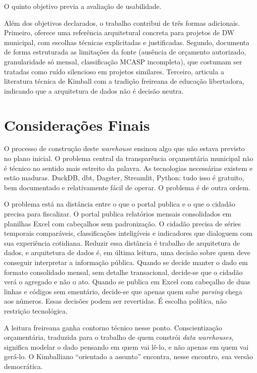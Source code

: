O quinto objetivo previa a avaliação de usabilidade. 

Além dos objetivos declarados, o trabalho contribui de três formas adicionais. Primeiro, oferece uma referência arquitetural concreta para projetos de DW municipal, com escolhas técnicas explicitadas e justificadas. Segundo, documenta de forma estruturada as limitações da fonte (ausência de orçamento autorizado, granularidade só mensal, classificação MCASP incompleta), que costumam ser tratadas como ruído silencioso em projetos similares. Terceiro, articula a literatura técnica de Kimball com a tradição freireana de educação libertadora, indicando que a arquitetura de dados não é decisão neutra.

\section{Considerações Finais}

O processo de construção deste \textit{warehouse} ensinou algo que não estava previsto no plano inicial. O problema central da transparência orçamentária municipal não é técnico no sentido mais estreito da palavra. As tecnologias necessárias existem e estão maduras. DuckDB, dbt, Dagster, Streamlit, Python: tudo isso é gratuito, bem documentado e relativamente fácil de operar. O problema é de outra ordem.

O problema está na distância entre o que o portal publica e o que o cidadão precisa para fiscalizar. O portal publica relatórios mensais consolidados em planilhas Excel com cabeçalhos sem padronização. O cidadão precisa de séries temporais comparáveis, classificações inteligíveis e indicadores que dialoguem com sua experiência cotidiana. Reduzir essa distância é trabalho de arquitetura de dados, e arquitetura de dados é, em última leitura, uma decisão sobre quem deve conseguir interpretar a informação pública. Quando se decide manter o dado em formato consolidado mensal, sem detalhe transacional, decide-se que o cidadão verá o agregado e não o ato. Quando se publica em Excel com cabeçalho de duas linhas e códigos sem ementário, decide-se que apenas quem sabe \textit{parsing} chega aos números. Essas decisões podem ser revertidas. É escolha política, não restrição tecnológica.

A leitura freireana ganha contorno técnico nesse ponto. Conscientização orçamentária, traduzida para o trabalho de quem constrói \textit{data warehouses}, significa modelar o dado pensando em quem vai lê-lo, e não apenas em quem vai gerá-lo. O Kimballiano ``orientado a assunto'' encontra, nesse encontro, sua versão democrática.

